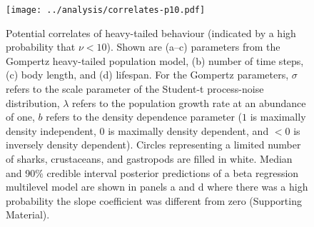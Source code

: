 \clearpage

\begin{figure}[htbp]
\begin{center}
\texttt{[image: ../analysis/correlates-p10.pdf]}
\caption{
Potential correlates of heavy-tailed behaviour (indicated by a high probability
that $\nu < 10$). Shown are (a--c) parameters from the Gompertz heavy-tailed
population model, (b) number of time steps, (c) body length, and (d) lifespan.
For the Gompertz parameters, $\sigma$ refers to the scale parameter of the
Student-t process-noise distribution, $\lambda$ refers to the population growth
rate at an abundance of one, $b$ refers to the density dependence parameter
($1$ is maximally density independent, $0$ is maximally density dependent, and
$<0$ is inversely density dependent).
Circles representing a limited number of sharks, crustaceans, and gastropods
are filled in white. Median and 90\% credible interval posterior predictions of
a beta regression multilevel model are shown in panels a and d where there was
a high probability the slope coefficient was different from zero (Supporting
Material).
}
\label{fig:correlates}
\end{center}
\end{figure}
